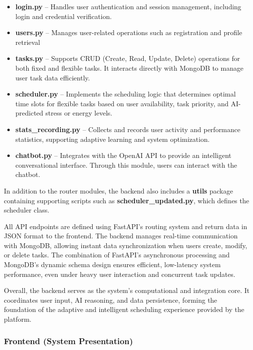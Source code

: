 \documentclass[12pt, a4paper]{article}
\begin{document}
            \begin{itemize}
                \item \textbf{login.py} – Handles user authentication and session management, including login and credential verification.
                \item \textbf{users.py} – Manages user-related operations such as registration and profile retrieval
                \item \textbf{tasks.py} – Supports CRUD (Create, Read, Update, Delete) operations for both fixed and flexible tasks. It interacts directly with MongoDB to manage user task data efficiently.
                \item \textbf{scheduler.py} – Implements the scheduling logic that determines optimal time slots for flexible tasks based on user availability, task priority, and AI-predicted stress or energy levels.
                \item \textbf{stats\_recording.py} – Collects and records user activity and performance statistics, supporting adaptive learning and system optimization.
                \item \textbf{chatbot.py} – Integrates with the OpenAI API to provide an intelligent conversational interface. Through this module, users can interact with the chatbot.
            \end{itemize}
            
            In addition to the router modules, the backend also includes a \textbf{utils} package containing supporting scripts such as \textbf{scheduler\_updated.py}, which defines the scheduler class.
            
            All API endpoints are defined using FastAPI’s routing system and return data in JSON format to the frontend. The backend manages real-time communication with MongoDB, allowing instant data synchronization when users create, modify, or delete tasks. The combination of FastAPI’s asynchronous processing and MongoDB’s dynamic schema design ensures efficient, low-latency system performance, even under heavy user interaction and concurrent task updates.
            
            Overall, the backend serves as the system’s computational and integration core. It coordinates user input, AI reasoning, and data persistence, forming the foundation of the adaptive and intelligent scheduling experience provided by the platform.
        
        \subsubsection{Frontend (System Presentation)}
        
\end{document}
